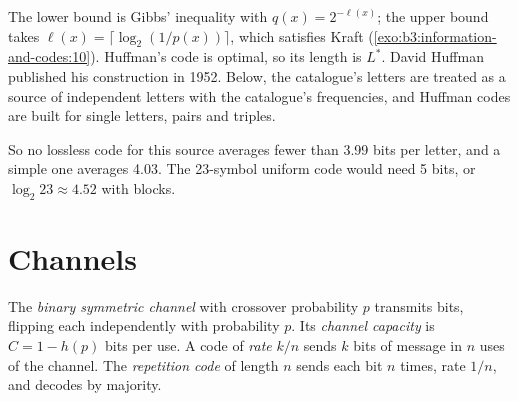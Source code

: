 The lower bound is Gibbs' inequality with $q(x) = 2^{-\ell(x)}$; the upper bound takes $\ell(x) = \lceil \log_2 (1/p(x)) \rceil$, which satisfies Kraft (\cref{exo:b3:information-and-codes:10}). Huffman's code is optimal, so its length is $L^*$. David Huffman published his construction in 1952. %
Below, the catalogue's letters are treated as a source of independent letters with the catalogue's frequencies, and Huffman codes are built for single letters, pairs and triples.

\label{lst:b3:information-and-codes:huffman}

\label{out:b3:information-and-codes:huffman}

So no lossless code for this source averages fewer than 3.99 bits per letter, and a simple one averages 4.03. The 23-symbol uniform code would need 5 bits, or $\log_2 23 \approx 4.52$ with blocks.

\section{Channels}\label{sec:b3:information-and-codes:channels}

\begin{definition}\label{def:b3:information-and-codes:channel}
The \emph{binary symmetric channel} with crossover probability $p$ transmits bits, flipping each independently with probability $p$. Its \emph{channel capacity} is $C = 1 - h(p)$ bits per use. A code of \emph{rate} $k/n$ sends $k$ bits of message in $n$ uses of the channel. The \emph{repetition code} of length $n$ sends each bit $n$ times, rate $1/n$, and decodes by majority.
\end{definition}

\begin{omfigure}
\par{}
\end{omfigure}

